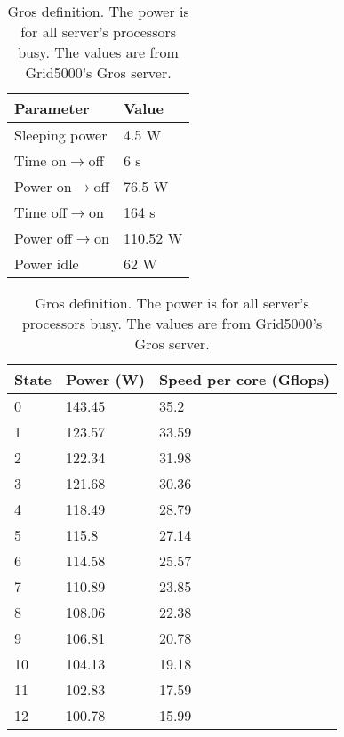 \begin{table}[!htb]
    \caption[Gros definition]{Gros definition. The power is for all server's processors busy. The values are from Grid5000's Gros server.}
    \label{tab:gros}
    \begin{minipage}{.45\linewidth}
      \centering
      \begin{tabular}{l|l}
        \hline
        Parameter & Value \\ \hline\hline
        Sleeping power & 4.5 W \\
        Time on$\rightarrow$off & 6 s \\
        Power on$\rightarrow$off & 76.5 W \\
        Time off$\rightarrow$on & 164 s \\
        Power off$\rightarrow$on & 110.52 W \\
        Power idle & 62 W \\ \hline
    \end{tabular}
    \end{minipage}%
    \begin{minipage}{.55\linewidth}
      \centering
      \begin{tabular}{l|l|l}
        \hline
        State & Power (W) & Speed per core (Gflops) \\ \hline\hline
        0 & 143.45 & 35.2 \\
        1 & 123.57 & 33.59 \\
        2 & 122.34 & 31.98 \\
        3 & 121.68 & 30.36 \\
        4 & 118.49 & 28.79 \\
        5 & 115.8 & 27.14 \\
        6 & 114.58 & 25.57 \\
        7 & 110.89 & 23.85 \\
        8 & 108.06 & 22.38 \\
        9 & 106.81 & 20.78 \\
        10 & 104.13 & 19.18 \\
        11 & 102.83 & 17.59 \\
        12 & 100.78 & 15.99 \\ \hline
    \end{tabular}
    \end{minipage} 
\end{table}